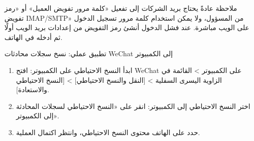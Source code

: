 \begin{tcbinfo}{ملاحظة}
عادةً يحتاج بريد الشركات إلى تفعيل «كلمة مرور تفويض العميل» أو «رمز تفويض IMAP/SMTP» من المسؤول، ولا يمكن استخدام كلمة مرور تسجيل الدخول على الويب مباشرة. عند فشل الدخول أنشئ رمز التفويض من إعدادات بريد الويب أولًا ثم أدخله في الهاتف.

\end{tcbinfo}

\begin{tcbpractice}{تطبيق عملي: نسخ سجلات محادثات WeChat إلى الكمبيوتر}
\begin{enumerate}
  \item ابدأ النسخ الاحتياطي على الكمبيوتر: افتح WeChat على الكمبيوتر > القائمة في الزاوية اليسرى السفلية > [النقل والنسخ الاحتياطي] > [النسخ الاحتياطي والاستعادة].
  \item اختر النسخ الاحتياطي إلى الكمبيوتر: انقر على «النسخ الاحتياطي لسجلات المحادثة إلى الكمبيوتر».
  \item حدد على الهاتف محتوى النسخ الاحتياطي، وانتظر اكتمال العملية.
\end{enumerate}

\end{tcbpractice}
